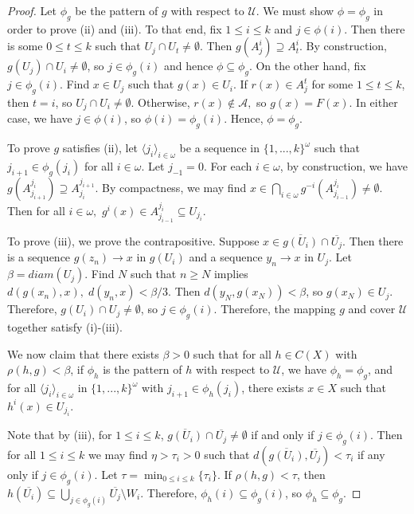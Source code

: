 \documentclass[10pt,a4paper]{amsart}
\numberwithin{equation}{section}
\begin{document}
\begin{proof}
Let $\phi_g$ be the pattern of $g$ with respect to $\mathcal{U}.$ We must show $\phi=\phi_g$ in order to prove (ii) and (iii). To that end, fix $1\leq i\leq k$ and $j\in \phi(i)$. Then there is some $0\leq t\leq k$ such that $U_j\cap U_t\neq \emptyset.$ Then $g(A_j^i)\supseteq A_t^i$. By construction, $g(U_j)\cap U_i \neq \emptyset$, so $j\in \phi_g(i)$ and hence $\phi\subseteq \phi_g$. On the other hand, fix $j\in \phi_g(i).$ Find $x\in U_j$ such that $g(x)\in U_i.$ If $r(x)\in A_j^t$ for some $1\leq t\leq k$, then $t=i$, so $U_j\cap U_i\neq \emptyset$. Otherwise, $r(x) \notin \mathcal{A},$ so $g(x)=F(x)$. In either case, we have $j\in \phi(i)$, so $\phi(i)=\phi_g(i).$ Hence, $\phi=\phi_g.$ 

To prove $g$ satisfies (ii), let $\langle j_i\rangle_{i\in \omega}$ be a sequence in $\{1,...,k\}^\omega$ such that $j_{i+1}\in \phi_g(j_i) $ for all $i\in \omega.$ Let $j_{-1}=0. $ For each $i\in \omega$, by construction, we have $g(A_{j_{i+1}}^{j_{i}})\supseteq A_{j_{i}}^{j_{i+1}}$. By compactness, we may find $x\in\displaystyle \bigcap_{i\in \omega} g^{-i}(A^{j_i}_{j_{i-1}})\neq \emptyset.$ Then for all $i\in \omega,$ $g^i(x) \in A^{j_i}_{j_{i-1}}\subseteq U_{j_i}.  $ 

To prove (iii), we prove the contrapositive. Suppose $x\in \overline{g(U_i)}\cap \overline{U_j}.$ Then there is a sequence $g(z_n)\to x$ in $g(U_i)$ and a sequence $y_n\to x$ in $U_j.$ Let $\beta= diam(U_j)$. Find $N$ such that $n\geq N$ implies $d(g(x_n),x),\; d(y_n,x)<\beta/3$. Then $d(y_N,g(x_N))<\beta$, so $g(x_N)\in U_j$. Therefore, $g(U_i)\cap U_j\neq \emptyset$, so $j\in \phi_g(i).$ Therefore, the mapping $g$ and cover $\mathcal{U}$ together satisfy (i)-(iii).



We now claim that there exists $\beta>0$ such that for all $h\in C(X)$ with $\rho(h,g)<\beta$, if $\phi_h$ is the pattern of $h$ with respect to $\mathcal{U}$, we have $\phi_h=\phi_g$, and for all $\langle j_i\rangle_{i\in \omega} $ in $\{1,...,k\}^\omega$ with $j_{i+1}\in \phi_h(j_i)$, there exists $x\in X$ such that $h^i(x)\in U_{j_i}$. 


Note that by (iii), for $1\leq i\leq k$, $\overline{g(U_i)}\cap \overline{U_j}\neq \emptyset$ if and only if $j\in \phi_g(i)$. Then for all $1\leq i\leq k$ we may find $\eta>\tau_i>0$ such that $d(\overline{g(U_i)},\overline{U_j})<\tau_i$ if any only if $j\in \phi_g(i).$ Let $\tau=\displaystyle\min_{0\leq i\leq k}\{\tau_i\}$. If $\rho(h,g)<\tau$, then $h(\overline{U_i})\subseteq \bigcup_{j\in \phi_g(i)}\overline{U_j}\setminus W_i.$ Therefore, $\phi_h(i)\subseteq \phi_g(i)$, so $\phi_h\subseteq \phi_g$. 


\end{proof}
\end{document}
